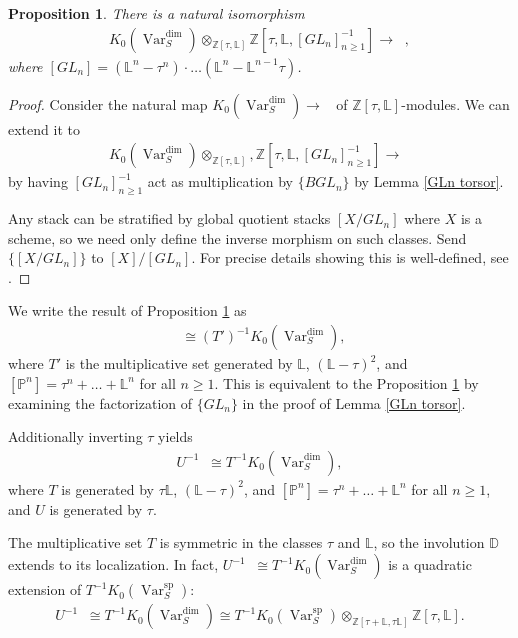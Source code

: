 \documentclass{amsart}
\newtheorem{prop}[thm]{Proposition}
\theoremstyle{definition}
\DeclareMathOperator{\Var}{Var}
\DeclareMathOperator{\spr}{sp}
\DeclareMathOperator{\Stk}{Stk}
\newcommand{\KdimS}{K_0(\Var_S^{\dim})}
\newcommand{\KsprS}{K_0(\Var_S^{\spr})}
\DeclareMathOperator{\KstkS}{K_0(\Stk_S^{\dim})}
\numberwithin{equation}{section}
\begin{document}
\begin{prop}\label{localization}
There is a natural isomorphism
\begin{align*}
    \KdimS \otimes_{\mathbb{Z}[\tau, \mathbb{L}]} \mathbb{Z}[\tau, \mathbb{L}, [GL_n]_{n \geq 1}^{-1}] \rightarrow \KstkS,
\end{align*}
where $[GL_n] = (\mathbb{L}^n - \tau^n) \cdot \ldots (\mathbb{L}^n - \mathbb{L}^{n-1}\tau)$.
\end{prop}

\begin{proof}
Consider the natural map $\KdimS \rightarrow \KstkS$ of $\mathbb{Z}[\tau, \mathbb{L}]$-modules. We can extend it to 
\begin{align*}
    \KdimS \otimes_{\mathbb{Z}[\tau, \mathbb{L}]}, \mathbb{Z}[\tau, \mathbb{L}, [GL_n]_{n \geq 1}^{-1}] \rightarrow \KstkS
\end{align*}
by having $[GL_n]_{n \geq 1}^{-1}$ act as multiplication by $\{ B GL_n \}$ by Lemma \ref{GLn torsor}.

Any stack can be stratified by global quotient stacks $[X/GL_n]$ where $X$ is a scheme, so we need only define the inverse morphism on such classes. Send $\{ [X/GL_n] \}$ to $[X]/[GL_n]$. For precise details showing this is well-defined, see \cite[Theorem $1.2$]{ekedahlstacks}.
\end{proof}

We write the result of Proposition \ref{localization} as
\begin{align*}
    \KstkS \cong (T')^{-1} \KdimS,
\end{align*}
where $T'$ is the multiplicative set generated by $\mathbb{L}$, $(\mathbb{L}-\tau)^2$, and $[\mathbb{P}^n] = \tau^n + \ldots + \mathbb{L}^n$ for all $n \geq 1$. This is equivalent to the Proposition \ref{localization} by examining the factorization of $\{ GL_n \}$ in the proof of Lemma \ref{GLn torsor}.

Additionally inverting $\tau$ yields
\begin{align*}
    U^{-1} \KstkS \cong T^{-1} \KdimS,
\end{align*}
where $T$ is generated by $\tau \mathbb{L}$, $(\mathbb{L}-\tau)^2$, and $[\mathbb{P}^n] = \tau^n + \ldots + \mathbb{L}^n$ for all $n \geq 1$, and $U$ is generated by $\tau$.

The multiplicative set $T$ is symmetric in the classes $\tau$ and $\mathbb{L}$, so the involution $\mathbb{D}$ extends to its localization. In fact, $U^{-1} \KstkS \cong T^{-1} \KdimS$ is a quadratic extension of $T^{-1} \KsprS$:
\begin{align*}
    U^{-1} \KstkS \cong T^{-1} \KdimS \cong T^{-1} \KsprS \otimes_{\mathbb{Z}[\tau+\mathbb{L}, \tau \mathbb{L}]} \mathbb{Z}[\tau, \mathbb{L}].
\end{align*}
\end{document}
